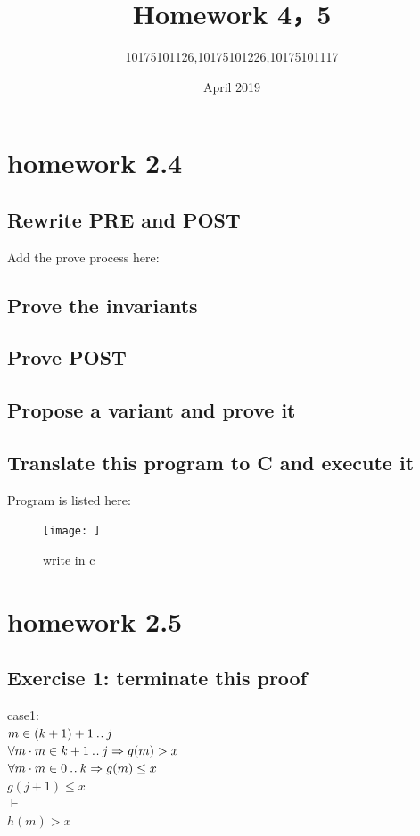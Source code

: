 \documentclass[11pt,a4paper,fleqn]{article}
\title{Homework 4，5}
\author{10175101126,10175101226,10175101117}
\date{April 2019}
\begin{document}
\maketitle

\section{ homework 2.4 }
\subsection{Rewrite PRE and POST }
\noindent
Add the prove process here: \\



\subsection{Prove the invariants}
\noindent


\subsection{ Prove POST}
\noindent




\subsection{Propose a variant and prove it}
\noindent


\subsection{Translate this program to C and execute it}
\noindent
Program is listed here:\\
\begin{figure}[h!]
\centering
\texttt{[image: ]}
\caption{ write in c}
\label{fig}
\end{figure}


\section{homework 2.5}

\subsection{Exercise 1: terminate this proof}
\noindent
case1:\\
$m \in (k + 1)+1 \mathbin{.\mkern1mu.} j$\\
$\forall m \cdot m \in k+1 \mathbin{.\mkern1mu.} j \Rightarrow g(m) > x  $\\
$\forall m \cdot m \in 0 \mathbin{.\mkern1mu.} k \Rightarrow g(m) \leq x $\\
$g(j+1) \leq x $\\
$\vdash$\\
$h(m)>x $\\
\end{document}

